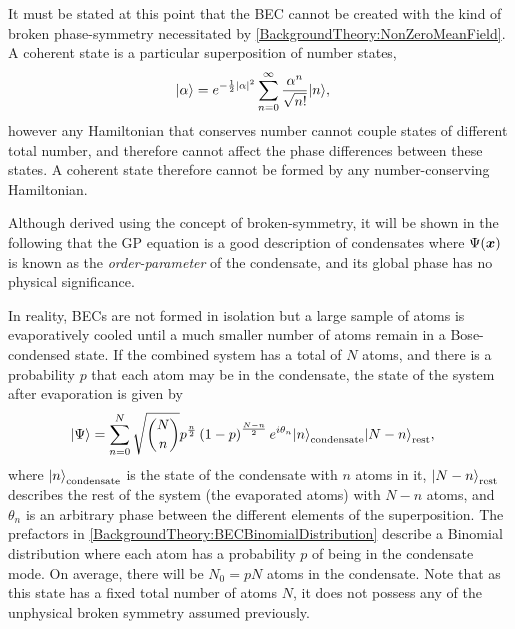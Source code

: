 It must be stated at this point that the BEC cannot be created with the kind of broken phase-symmetry necessitated by \eqref{BackgroundTheory:NonZeroMeanField}.  A coherent state is a particular superposition of number states,
\begin{align}
    {\ensuremath{\left|\alpha\right>}} &= e^{-\frac{1}{2} \left|\alpha\right|^2} \sum_{n=0}^{\infty} \frac{\alpha^n}{\sqrt{n!}} {\left|n\right>},
\end{align}
however any Hamiltonian that conserves number cannot couple states of different total number, and therefore cannot affect the phase differences between these states.  A coherent state therefore cannot be formed by any number-conserving Hamiltonian.

Although derived using the concept of broken-symmetry, it will be shown in the following that the GP equation is a good description of condensates where $\Psi(\bm{x})$ is known as the \emph{order-parameter} of the condensate, and its global phase has no physical significance.

In reality, BECs are not formed in isolation but a large sample of atoms is evaporatively cooled until a much smaller number of atoms remain in a Bose-condensed state.  If the combined system has a total of $N$ atoms, and there is a probability $p$ that each atom may be in the condensate, the state of the system after evaporation is given by
\begin{align}
    \ket{\Psi} &= \sum_{n=0}^N \sqrt{N \choose n}   p^{\frac{n}{2}} \left(1-p\right)^{\frac{N-n}{2}}  e^{i \theta_n} \ket{n}_\text{condensate}\ket{N-n}_\text{rest}, \label{BackgroundTheory:BECBinomialDistribution}
\end{align}
where ${\left|n\right>}_\text{condensate}$ is the state of the condensate with $n$ atoms in it, ${\left|N-n\right>}_\text{rest}$ describes the rest of the system (the evaporated atoms) with $N-n$ atoms, and $\theta_n$ is an arbitrary phase between the different elements of the superposition.  The prefactors in \eqref{BackgroundTheory:BECBinomialDistribution} describe a Binomial distribution where each atom has a probability $p$ of being in the condensate mode.  On average, there will be $N_0 = p N$ atoms in the condensate.  Note that as this state has a fixed total number of atoms $N$, it does not possess any of the unphysical broken symmetry assumed previously.

